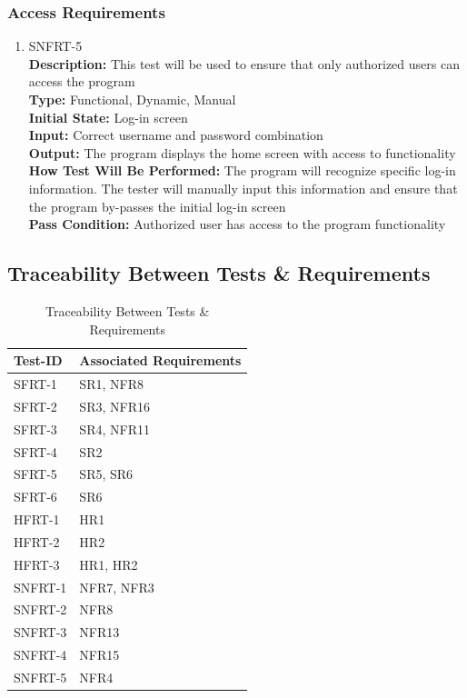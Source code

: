 \documentclass[12pt, titlepage]{article}
\begin{document}
\subsubsection{Access Requirements}
\begin{enumerate}
    \item{SNFRT-5\\}
    \textbf{Description:} This test will be used to ensure that only authorized users can access the program\\
    \textbf{Type:} Functional, Dynamic, Manual\\
    \textbf{Initial State:} Log-in screen\\
    \textbf{Input:} Correct username and password combination\\
    \textbf{Output:} The program displays the home screen with access to functionality\\
    \textbf{How Test Will Be Performed:} The program will recognize specific log-in information. The tester will manually input this information and ensure that the program by-passes the initial log-in screen\\
    \textbf{Pass Condition:} Authorized user has access to the program functionality\\
\end{enumerate}

\subsection{Traceability Between Tests \& Requirements}

\begin{center}
\begin{table}[H]
    \centering
    \begin{tabular}{|p{2cm}|p{7cm}|}
    \hline
    \textbf{Test-ID} & \textbf{Associated Requirements}\\
    \hline
    SFRT-1 & SR1, NFR8\\
    \hline
    SFRT-2 & SR3, NFR16\\
    \hline
    SFRT-3 & SR4, NFR11\\
    \hline
    SFRT-4 & SR2\\
    \hline
    SFRT-5 & SR5, SR6\\
    \hline
    SFRT-6 & SR6\\
    \hline
    HFRT-1 & HR1\\
    \hline
    HFRT-2 & HR2\\
    \hline
    HFRT-3 & HR1, HR2\\
    \hline
    SNFRT-1 & NFR7, NFR3\\
    \hline
    SNFRT-2 & NFR8\\
    \hline
    SNFRT-3 & NFR13\\
    \hline
    SNFRT-4 & NFR15\\
    \hline
    SNFRT-5 & NFR4\\
    \hline
    \end{tabular}
    \caption{Traceability Between Tests \& Requirements}
    \label{tab:my_label}
\end{table}
\end{center}
\end{document}
